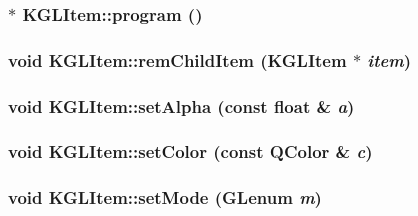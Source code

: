 \hypertarget{class_k_g_l_item_3d4fca70cb1b6c9fab99b02696c50ca0}{
\subsubsection[{program}]{$\ast$ KGLItem::program ()}}
\label{class_k_g_l_item_3d4fca70cb1b6c9fab99b02696c50ca0}


\hypertarget{class_k_g_l_item_42b7c5842dc8e7ee01c46b2a767e021a}{
\subsubsection[{remChildItem}]{\setlength{\rightskip}{0pt plus 5cm}void KGLItem::remChildItem ({\bf KGLItem} $\ast$ {\em item})}}
\label{class_k_g_l_item_42b7c5842dc8e7ee01c46b2a767e021a}


\hypertarget{class_k_g_l_item_0e29a2ca6924be0e2c950fd5c764fdab}{
\subsubsection[{setAlpha}]{\setlength{\rightskip}{0pt plus 5cm}void KGLItem::setAlpha (const float \& {\em a})}}
\label{class_k_g_l_item_0e29a2ca6924be0e2c950fd5c764fdab}


\hypertarget{class_k_g_l_item_ccd2a4bf039b7274a0df572bd341d2d9}{
\subsubsection[{setColor}]{\setlength{\rightskip}{0pt plus 5cm}void KGLItem::setColor (const QColor \& {\em c})}}
\label{class_k_g_l_item_ccd2a4bf039b7274a0df572bd341d2d9}


\hypertarget{class_k_g_l_item_333a6829b561f2d9a5f904712aa3e3ed}{
\subsubsection[{setMode}]{\setlength{\rightskip}{0pt plus 5cm}void KGLItem::setMode (GLenum {\em m})}}
\label{class_k_g_l_item_333a6829b561f2d9a5f904712aa3e3ed}


